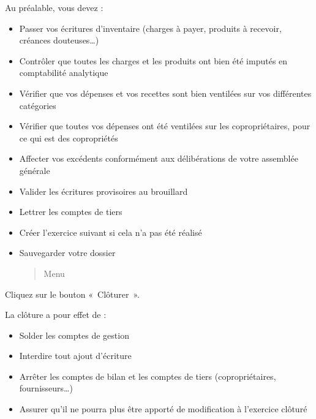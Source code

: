 \documentclass[a4paper,10pt,oneside,french]{sphinxmanual}
\begin{document}
Au préalable, vous devez :
\begin{itemize}
\item {} 
Passer vos écritures d’inventaire (charges à payer, produits à recevoir, créances douteuses…)

\item {} 
Contrôler que toutes les charges et les produits ont bien été imputés en comptabilité analytique

\item {} 
Vérifier que vos dépenses et vos recettes sont bien ventilées sur vos différentes catégories

\item {} 
Vérifier que toutes vos dépenses ont été ventilées sur les copropriétaires, pour ce qui est des copropriétés

\item {} 
Affecter vos excédents conformément aux délibérations de votre assemblée générale

\item {} 
Valider les écritures provisoires au brouillard

\item {} 
Lettrer les comptes de tiers

\item {} 
Créer l’exercice suivant si cela n’a pas été réalisé

\item {} 
Sauvegarder votre dossier
\begin{quote}

Menu 
\end{quote}

\end{itemize}

Cliquez sur le bouton « Clôturer ».

La clôture a pour effet de :
\begin{itemize}
\item {} 
Solder les comptes de gestion

\item {} 
Interdire tout ajout d’écriture

\item {} 
Arrêter les comptes de bilan et les comptes de tiers (copropriétaires, fournisseurs…)

\item {} 
Assurer qu’il ne pourra plus être apporté de modification à l’exercice clôturé

\end{itemize}
\end{document}
